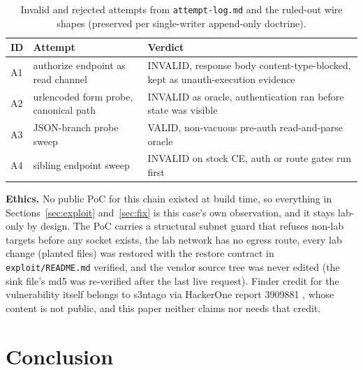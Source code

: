 \documentclass[journal]{IEEEtran}
\begin{document}
\begin{table}[t]
\caption{Invalid and rejected attempts from \texttt{attempt-log.md} and the
ruled-out wire shapes (preserved per single-writer append-only doctrine).}
\centering\footnotesize
\begin{tabular}{p{0.6cm}p{3.9cm}p{2.8cm}}
\toprule
ID & Attempt & Verdict \\
\midrule
A1 & authorize endpoint as read channel & INVALID, response body
content-type-blocked, kept as unauth-execution evidence \\
A2 & urlencoded form probe, canonical path & INVALID as oracle,
authentication ran before state was visible \\
A3 & JSON-branch probe sweep & VALID, non-vacuous pre-auth read-and-parse
oracle \\
A4 & sibling endpoint sweep & INVALID on stock CE, auth or route gates run
first \\
\bottomrule
\end{tabular}
\label{tab:negative}
\end{table}

\textbf{Ethics.} No public PoC for this chain existed at build time, so
everything in Sections~\ref{sec:exploit} and~\ref{sec:fix} is this case's own
observation, and it stays lab-only by design. The PoC carries a structural
subnet guard that refuses non-lab targets before any socket exists, the lab
network has no egress route, every lab change (planted files) was restored
with the restore contract in \texttt{exploit/README.md} verified, and the
vendor source tree was never edited (the sink file's md5 was re-verified after
the last live request). Finder credit for the vulnerability itself belongs to
s3ntago via HackerOne report 3909881 \cite{h1}, whose content is not public,
and this
paper neither claims nor needs that credit.

\section{Conclusion}
\end{document}
